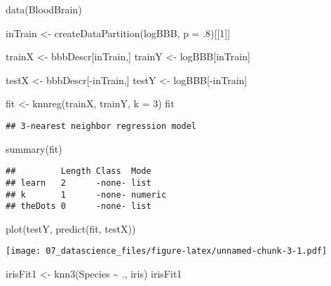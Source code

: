 \documentclass[
]{book}
\newenvironment{Shaded}{\begin{snugshade}}{\end{snugshade}}
\newcommand{\AttributeTok}[1]{\textcolor[rgb]{0.77,0.63,0.00}{#1}}
\newcommand{\DecValTok}[1]{\textcolor[rgb]{0.00,0.00,0.81}{#1}}
\newcommand{\FunctionTok}[1]{\textcolor[rgb]{0.00,0.00,0.00}{#1}}
\newcommand{\NormalTok}[1]{#1}
\newcommand{\OtherTok}[1]{\textcolor[rgb]{0.56,0.35,0.01}{#1}}
\newcommand{\SpecialCharTok}[1]{\textcolor[rgb]{0.00,0.00,0.00}{#1}}
\begin{document}
\begin{Shaded}
\begin{Highlighting}[]
\FunctionTok{data}\NormalTok{(BloodBrain)}

\NormalTok{inTrain }\OtherTok{\textless{}{-}} \FunctionTok{createDataPartition}\NormalTok{(logBBB, }\AttributeTok{p =}\NormalTok{ .}\DecValTok{8}\NormalTok{)[[}\DecValTok{1}\NormalTok{]]}

\NormalTok{trainX }\OtherTok{\textless{}{-}}\NormalTok{ bbbDescr[inTrain,]}
\NormalTok{trainY }\OtherTok{\textless{}{-}}\NormalTok{ logBBB[inTrain]}

\NormalTok{testX }\OtherTok{\textless{}{-}}\NormalTok{ bbbDescr[}\SpecialCharTok{{-}}\NormalTok{inTrain,]}
\NormalTok{testY }\OtherTok{\textless{}{-}}\NormalTok{ logBBB[}\SpecialCharTok{{-}}\NormalTok{inTrain]}

\NormalTok{fit }\OtherTok{\textless{}{-}} \FunctionTok{knnreg}\NormalTok{(trainX, trainY, }\AttributeTok{k =} \DecValTok{3}\NormalTok{)}
\NormalTok{fit}
\end{Highlighting}
\end{Shaded}

\begin{verbatim}
## 3-nearest neighbor regression model
\end{verbatim}

\begin{Shaded}
\begin{Highlighting}[]
\FunctionTok{summary}\NormalTok{(fit)}
\end{Highlighting}
\end{Shaded}

\begin{verbatim}
##         Length Class  Mode   
## learn   2      -none- list   
## k       1      -none- numeric
## theDots 0      -none- list
\end{verbatim}

\begin{Shaded}
\begin{Highlighting}[]
\FunctionTok{plot}\NormalTok{(testY, }\FunctionTok{predict}\NormalTok{(fit, testX))}
\end{Highlighting}
\end{Shaded}

\texttt{[image: 07\_datascience\_files/figure-latex/unnamed-chunk-3-1.pdf]}

\begin{Shaded}
\begin{Highlighting}[]
\NormalTok{irisFit1 }\OtherTok{\textless{}{-}} \FunctionTok{knn3}\NormalTok{(Species }\SpecialCharTok{\textasciitilde{}}\NormalTok{ ., iris)}
\NormalTok{irisFit1}
\end{Highlighting}
\end{Shaded}
\end{document}

